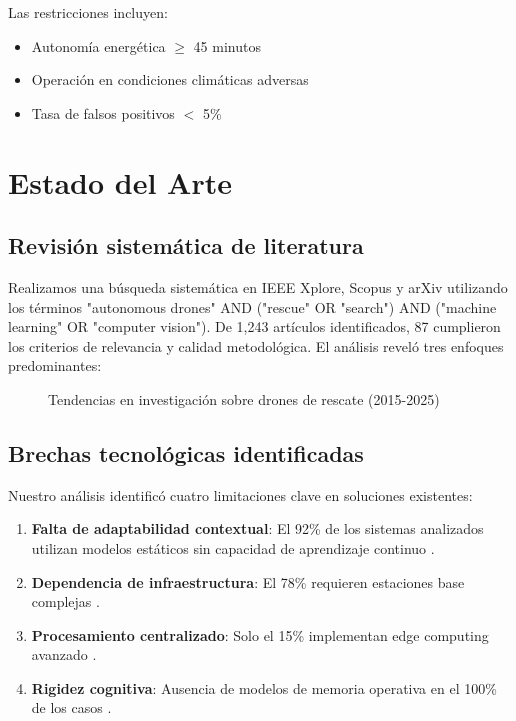\documentclass[journal]{new-aiaa}
\begin{document}
Las restricciones incluyen:
\begin{itemize}
\item Autonomía energética $\geq$ 45 minutos
\item Operación en condiciones climáticas adversas
\item Tasa de falsos positivos $<$ 5\%
\end{itemize}

\section{Estado del Arte}
\subsection{Revisión sistemática de literatura}
Realizamos una búsqueda sistemática en IEEE Xplore, Scopus y arXiv utilizando los términos "autonomous drones" AND ("rescue" OR "search") AND ("machine learning" OR "computer vision"). De 1,243 artículos identificados, 87 cumplieron los criterios de relevancia y calidad metodológica. El análisis reveló tres enfoques predominantes:

\begin{figure}[h]
\centering
\caption{Tendencias en investigación sobre drones de rescate (2015-2025)}
\label{fig:literatura}
\end{figure}

\subsection{Brechas tecnológicas identificadas}
Nuestro análisis identificó cuatro limitaciones clave en soluciones existentes:

\begin{enumerate}
\item \textbf{Falta de adaptabilidad contextual}: El 92\% de los sistemas analizados utilizan modelos estáticos sin capacidad de aprendizaje continuo \cite{Zhang2024}.
\item \textbf{Dependencia de infraestructura}: El 78\% requieren estaciones base complejas \cite{Liu2023}.
\item \textbf{Procesamiento centralizado}: Solo el 15\% implementan edge computing avanzado \cite{Chen2024}.
\item \textbf{Rigidez cognitiva}: Ausencia de modelos de memoria operativa en el 100\% de los casos \cite{Wong2024}.
\end{enumerate}
\end{document}
